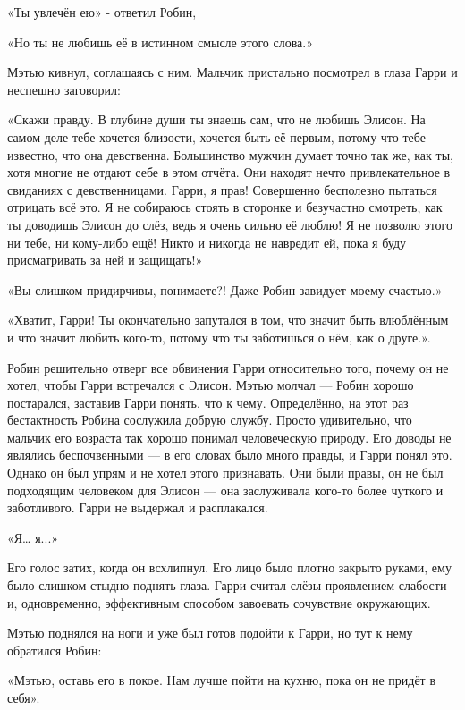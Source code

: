 \documentclass[a4paper,12pt]{book}
\begin{document}
\par
«Ты увлечён ею» - ответил Робин,
\par
«Но ты не любишь её в истинном смысле этого слова.»
\par
Мэтью кивнул, соглашаясь с ним. Мальчик пристально посмотрел в глаза Гарри и неспешно заговорил:
\par
«Скажи правду. В глубине души ты знаешь сам, что не любишь Элисон. На самом деле тебе хочется близости, хочется быть её первым, потому что тебе известно, что она девственна. Большинство мужчин думает точно так же, как ты, хотя многие не отдают себе в этом отчёта. Они находят нечто привлекательное в свиданиях с девственницами. Гарри, я прав! Совершенно бесполезно пытаться отрицать всё это. Я не собираюсь стоять в сторонке и безучастно смотреть, как ты доводишь Элисон до слёз, ведь я очень сильно её люблю! Я не позволю этого ни тебе, ни кому-либо ещё! Никто и никогда не навредит ей, пока я буду присматривать за ней и защищать!»
\par
«Вы слишком придирчивы, понимаете?! Даже Робин завидует моему счастью.»
\par
«Хватит, Гарри! Ты окончательно запутался в том, что значит быть влюблённым и что значит любить кого-то, потому что ты заботишься о нём, как о друге.».
\par
Робин решительно отверг все обвинения Гарри относительно того, почему он не хотел, чтобы Гарри встречался с Элисон. Мэтью молчал — Робин хорошо постарался, заставив Гарри понять, что к чему. Определённо, на этот раз бестактность Робина сослужила добрую службу. Просто удивительно, что мальчик его возраста так хорошо понимал человеческую природу. Его доводы не являлись беспочвенными — в его словах было много правды, и Гарри понял это. Однако он был упрям и не хотел этого признавать. Они были правы, он не был подходящим человеком для Элисон — она заслуживала кого-то более чуткого и заботливого. Гарри не выдержал и расплакался.
\par
«Я… я...»
\par
Его голос затих, когда он всхлипнул. Его лицо было плотно закрыто руками, ему было слишком стыдно поднять глаза. Гарри считал слёзы проявлением слабости и, одновременно, эффективным способом завоевать сочувствие окружающих.
\par
Мэтью поднялся на ноги и уже был готов подойти к Гарри, но тут к нему обратился Робин:
\par
«Мэтью, оставь его в покое. Нам лучше пойти на кухню, пока он не придёт в себя».
\par
\end{document}
